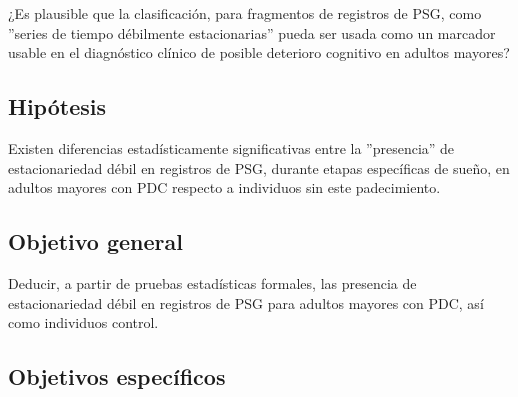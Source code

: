 ¿Es plausible que la clasificaci\'on, para fragmentos de registros de PSG, como ''series de tiempo 
d\'ebilmente estacionarias'' pueda ser usada como un marcador usable en el diagn\'ostico cl\'inico
de posible deterioro cognitivo en adultos mayores?


\subsection{Hip\'otesis}


Existen diferencias estad\'isticamente significativas entre la ''presencia'' de estacionariedad 
d\'ebil en registros de PSG, durante etapas espec\'ificas de sue\~no, en adultos mayores con PDC 
respecto a individuos sin este padecimiento.


\subsection{Objetivo general}


Deducir, a partir de pruebas estad\'isticas formales, las presencia de estacionariedad d\'ebil en
registros de PSG para adultos mayores con PDC, as\'i como individuos control.


\subsection{Objetivos espec\'ificos}

